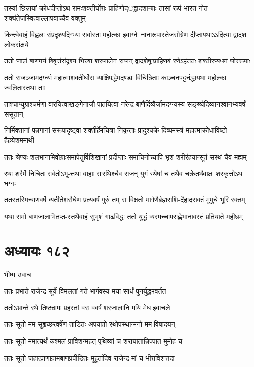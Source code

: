 \twolineshloka
{तस्यां छिन्नायां क्रोधदीप्तोऽथ रामःशक्तीर्घोराः प्राहिणोद््द्वादशान्याः}
{तासां रूपं भारत नोत शक्यंतेजस्वित्वाल्लाघवाच्चैव वक्तुम्}


\twolineshloka
{किन्त्वेवाहं विह्वलः संप्रदृश्यदिग्भ्यः सर्वास्ता महोत्का इवाग्नेः}
{नानारूपास्तेजसोग्रेण दीप्तायथाऽऽदित्या द्वादश लोकसंक्षये}


\twolineshloka
{ततो जालं बाणमयं विवृत्तंसंदृश्य भित्त्वा शरजालेन राजन्}
{द्वादशेषून्प्राहिणवं रणेऽहंततः शक्तीरप्यधमं घोररूपाः}


\twolineshloka
{ततो राजञ्जामदग्न्यो महात्माशक्तीर्घोरा व्याक्षिपद्धेमदण्डाः}
{विचित्रिताः काञ्चनपट्टनंद्धायथा महोल्का ज्वलितास्तथा ताः}


\twolineshloka
{ताश्चाप्युग्राश्चर्मणा वारयित्वाखङ्गेनाजौ पातयित्वा नरेन्द्र}
{बाणैर्दिव्यैर्जामदग्न्यस्य सङ्ख्येदिव्यानश्वानभ्यवर्षं ससूतान्}


\twolineshloka
{निर्मिक्तानां पन्नगानां सरूपादृष्ट्वा शक्तीर्हेमचित्रा निकृत्ताः}
{प्रादुश्चक्रे दिव्यमस्त्रं महात्माक्रोधाविष्टो हैहयेशममाथी}


\twolineshloka
{ततः श्रेण्यः शलभानामिवोग्राःसमापेतुर्विशिखानां प्रदीप्ताः}
{समाचिनोच्चापि भृशं शरीरंहयान्सूतं सरथं चैव मह्यम्}


\twolineshloka
{रथः शरैर्मे निचितः सर्वतोऽभू-त्तथा वाहाः सारथिश्चैव राजन्}
{युगं रथेषां च तथैव चक्रेतथैवाक्षः शरकृत्तोऽथ भग्नः}


\twolineshloka
{ततस्तस्मिन्बाणवर्षे व्यतीतेशरौघेण प्रत्यवर्षं गुरुं तम्}
{स विक्षतो मार्गणैर्ब्रह्मराशि-र्देहादसक्तं मुमुचे भूरि रक्तम्}


\twolineshloka
{यथा रामो बाणजालाभितप्त-स्तथैवाहं सुभृशं गाढविद्धः}
{ततो युद्धं व्यरमच्चापराह्णेभानावस्तं प्रतियाते महीध्रम्}


\chapter{अध्यायः १८२}
\twolineshloka
{भीष्म उवाच}
{}


\twolineshloka
{ततः प्रभाते राजेन्द्र सूर्ये विमलतां गते}
{भार्गवस्य मया सार्धं पुनर्युद्धमवर्तत}


\twolineshloka
{ततोऽभ्रान्ते रथे तिष्ठन्रामः प्रहरतां वरः}
{ववर्ष शरजालानि मयि मेध इवाचले}


\twolineshloka
{ततः सूतो मम सुहृच्छरवर्षेण ताडितः}
{अपयातो रथोपस्थान्मनो मम विषादयन्}


\twolineshloka
{ततः सूतो ममात्यर्थं कश्मलं प्राविशन्महत्}
{पृथिव्यां च शराघातान्निपपात मुमोह च}


\twolineshloka
{ततः सूतो जहात्प्राणान्रामबाणप्रपीडितः}
{मुहूर्तादिव राजेन्द्र मां च भीराविशत्तदा}


